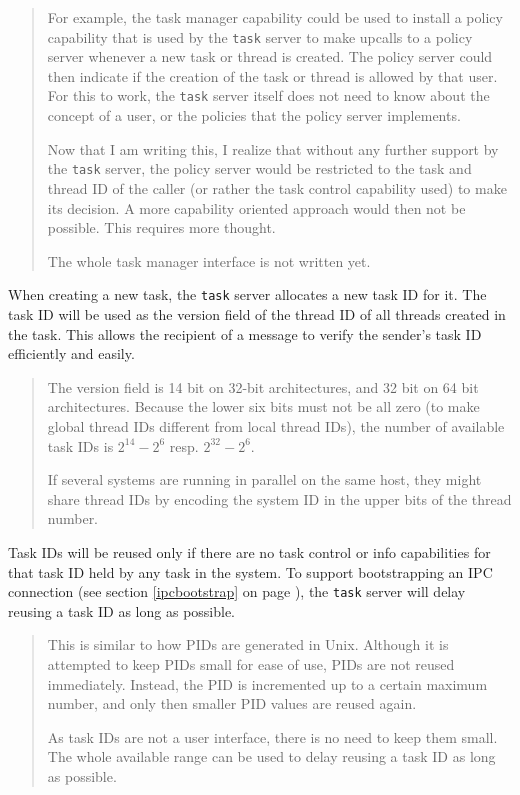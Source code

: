 \documentclass[9pt,a4paper]{extarticle}
\newenvironment{comment}{\footnotesize \begin{quote}}{\end{quote}}
\begin{document}
\begin{comment}
  For example, the task manager capability could be used to install a
  policy capability that is used by the \texttt{task} server to make
  upcalls to a policy server whenever a new task or thread is created.
  The policy server could then indicate if the creation of the task or
  thread is allowed by that user.  For this to work, the \texttt{task}
  server itself does not need to know about the concept of a user, or
  the policies that the policy server implements.
  
  Now that I am writing this, I realize that without any further
  support by the \texttt{task} server, the policy server would be
  restricted to the task and thread ID of the caller (or rather the
  task control capability used) to make its decision.  A more
  capability oriented approach would then not be possible.  This
  requires more thought.
  
  The whole task manager interface is not written yet.
\end{comment}

When creating a new task, the \texttt{task} server allocates a new
task ID for it.  The task ID will be used as the version field of the
thread ID of all threads created in the task.  This allows the
recipient of a message to verify the sender's task ID efficiently and
easily.

\begin{comment}
  The version field is 14 bit on 32-bit architectures, and 32 bit on
  64 bit architectures.  Because the lower six bits must not be all
  zero (to make global thread IDs different from local thread IDs),
  the number of available task IDs is $2^{14} - 2^6$ resp. $2^{32} -
  2^6$.
  
  If several systems are running in parallel on the same host, they
  might share thread IDs by encoding the system ID in the upper bits
  of the thread number.
\end{comment}

Task IDs will be reused only if there are no task control or info
capabilities for that task ID held by any task in the system.  To
support bootstrapping an IPC connection (see section
\ref{ipcbootstrap} on page \pageref{ipcbootstrap}), the \texttt{task}
server will delay reusing a task ID as long as possible.

\begin{comment}
  This is similar to how PIDs are generated in Unix.  Although it is
  attempted to keep PIDs small for ease of use, PIDs are not reused
  immediately.  Instead, the PID is incremented up to a certain
  maximum number, and only then smaller PID values are reused again.
  
  As task IDs are not a user interface, there is no need to keep them
  small.  The whole available range can be used to delay reusing a
  task ID as long as possible.
\end{comment}
\end{document}

